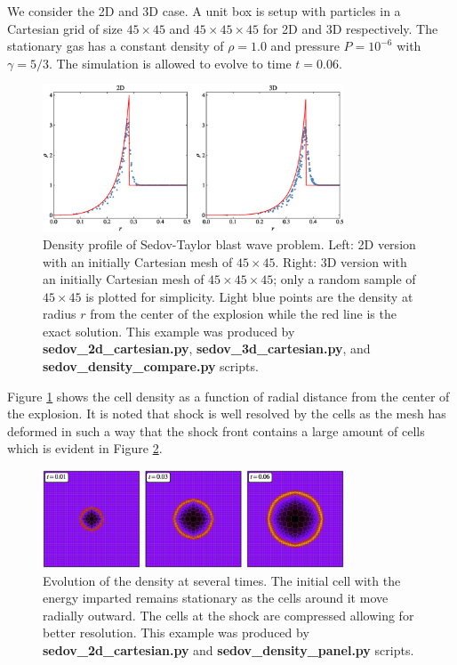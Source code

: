 We consider the 2D and 3D case. A unit box is setup with particles in a Cartesian grid of size
$45\times 45$ and $45 \times 45 \times 45$ for 2D and 3D respectively. The stationary gas has
a constant density of $\rho = 1.0$ and pressure $P = 10^{-6}$ with $\gamma=5/3$. The simulation is
allowed to evolve to time $t=0.06$.
\begin{figure}
    \begin{center}
        \includegraphics[width=0.8\textwidth]{figures/sedov_compare.eps}
        \caption{Density profile of Sedov-Taylor blast wave problem. Left: 2D version with an 
        initially Cartesian mesh of $45 \times 45$. Right: 3D version with an initially 
        Cartesian mesh of $45 \times 45 \times 45$; only a random sample of $45\times45$ is
        plotted for simplicity. Light blue points are the density at radius $r$ 
        from the center of the explosion while the red line is the exact solution.
        This example was produced by \textbf{sedov\_2d\_cartesian.py},
        \textbf{sedov\_3d\_cartesian.py}, and \textbf{sedov\_density\_compare.py} scripts.}
        \label{fig.sedov}
    \end{center}
\end{figure}
Figure \ref{fig.sedov} shows the cell density as a function of radial distance from the center of 
the explosion. It is noted that shock is well resolved by the cells as the mesh has deformed in such 
a way that the shock front contains a large amount of cells which is evident in
Figure \ref{fig.sedov_panel}.
\begin{figure}
    \begin{center}
        \includegraphics[width=0.8\textwidth]{figures/sedov_panel.eps}
        \caption{Evolution of the density at several times. The initial cell with the energy
        imparted remains stationary as the cells around it move radially outward. The cells at
        the shock are compressed allowing for better resolution. This example was produced by 
        \textbf{sedov\_2d\_cartesian.py} and \textbf{sedov\_density\_panel.py} scripts.}
        \label{fig.sedov_panel}
    \end{center}
\end{figure}
